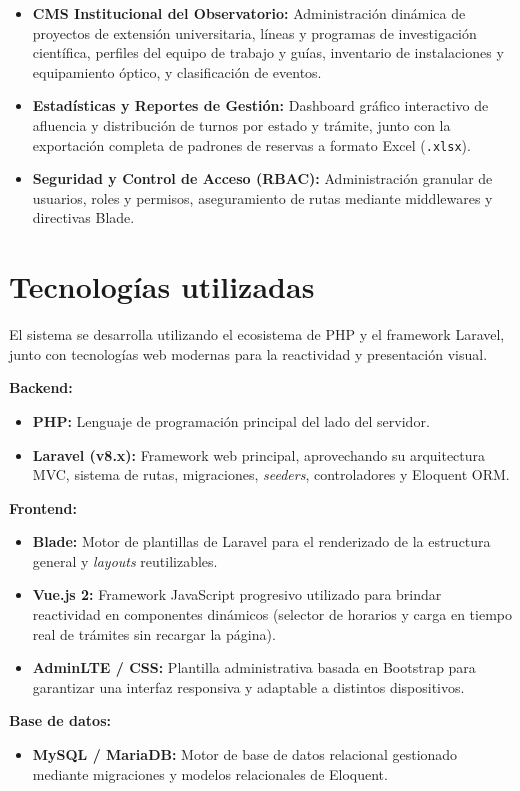 \begin{itemize}
    \item \textbf{CMS Institucional del Observatorio:} Administración dinámica de proyectos de extensión universitaria, líneas y programas de investigación científica, perfiles del equipo de trabajo y guías, inventario de instalaciones y equipamiento óptico, y clasificación de eventos.
    \item \textbf{Estadísticas y Reportes de Gestión:} Dashboard gráfico interactivo de afluencia y distribución de turnos por estado y trámite, junto con la exportación completa de padrones de reservas a formato Excel (\texttt{.xlsx}).
    \item \textbf{Seguridad y Control de Acceso (RBAC):} Administración granular de usuarios, roles y permisos, aseguramiento de rutas mediante middlewares y directivas Blade.
\end{itemize}

\section{Tecnologías utilizadas}
El sistema se desarrolla utilizando el ecosistema de PHP y el framework Laravel, junto con tecnologías web modernas para la reactividad y presentación visual.

\textbf{Backend:}
\begin{itemize}
    \item \textbf{PHP:} Lenguaje de programación principal del lado del servidor.
    \item \textbf{Laravel (v8.x):} Framework web principal, aprovechando su arquitectura MVC, sistema de rutas, migraciones, \textit{seeders}, controladores y Eloquent ORM.
\end{itemize}

\textbf{Frontend:}
\begin{itemize}
    \item \textbf{Blade:} Motor de plantillas de Laravel para el renderizado de la estructura general y \textit{layouts} reutilizables.
    \item \textbf{Vue.js 2:} Framework JavaScript progresivo utilizado para brindar reactividad en componentes dinámicos (selector de horarios y carga en tiempo real de trámites sin recargar la página).
    \item \textbf{AdminLTE / CSS:} Plantilla administrativa basada en Bootstrap para garantizar una interfaz responsiva y adaptable a distintos dispositivos.
\end{itemize}

\textbf{Base de datos:}
\begin{itemize}
    \item \textbf{MySQL / MariaDB:} Motor de base de datos relacional gestionado mediante migraciones y modelos relacionales de Eloquent.
\end{itemize}

